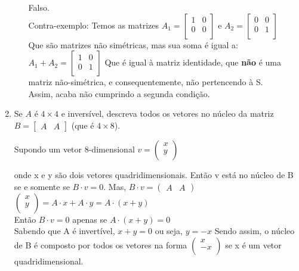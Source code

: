 \documentclass[leqno]{article}
\numberwithin{equation}{section}
\begin{document}
\begin{enumerate}
\begin{enumerate}
			\begin{sol} 
				Falso.\\
				\newline
				Contra-exemplo:
				Temos as matrizes $A_1 = 
				\begin{bmatrix}
					1 & 0\\
					0 & 0\\ 
				\end{bmatrix}$ e $A_2 = 
				\begin{bmatrix}
					0 & 0\\
					0 & 1\\ 
				\end{bmatrix}$\\
			Que são matrizes não simétricas, mas sua soma é igual a:\\
			$A_1 + A_2 = \begin{bmatrix}
				1 & 0\\
				0 & 1\\ 
			\end{bmatrix}$
			Que é igual à matriz identidade, que \textbf{não} é uma matriz não-simétrica, e consequentemente, não pertencendo à S.\\
			Assim, acaba não cumprindo a segunda condição.
			\end{sol} 
			
		\end{enumerate}
		
		\item Se $A$ é $4\times 4$ e inversível, descreva todos os vetores no núcleo da matriz $B = \begin{bmatrix}A & A \end{bmatrix}$ (que é $4\times 8$).
		
		\begin{sol} 
			Supondo um vetor 8-dimensional $v = \left(
			\begin{array}{c}
				x\\
				y\\
			\end{array}
			\right)$
			
			onde x e y são dois vetores quadridimensionais. Então v está no
			núcleo de B se e somente se $B \cdot v = 0$. Mas, 
			$B \cdot v = \begin{pmatrix}
				A & A 
			\end{pmatrix}$
			$\left(
			\begin{array}{c}
				x\\
				y\\
			\end{array}
			\right) = A \cdot x + A \cdot y = A \cdot (x + y)$\\
			Então $B \cdot v = 0$ apenas se $A \cdot (x + y) = 0$\\
			Sabendo que A é invertível, $x + y = 0$ ou seja, $y = -x$
			Sendo assim, o núcleo de B é composto por todos os vetores na forma $\left(
			\begin{array}{c}
				x\\
				-x\\
			\end{array}
			\right)$ se x é um vetor quadridimensional.
		\end{sol} 
		

\end{enumerate}
\end{document}
